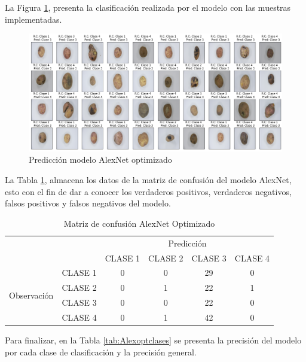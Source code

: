 \newpage
La Figura \ref{fig:pre_alex_opt}, presenta la clasificación realizada por el modelo con las muestras implementadas.
\begin{figure}[ht]
	\centering
	\includegraphics[scale=0.4]{Figs/502.png}
	\caption{Predicción modelo AlexNet optimizado}
	\label{fig:pre_alex_opt}
\end{figure}


La Tabla \ref{tab:MC_ALEX_OPT}, almacena los datos de la matriz de confusión del modelo AlexNet, esto con el fin de dar a conocer los verdaderos positivos, verdaderos negativos, falsos positivos y falsos negativos del modelo.


\begin{table}[htbp]
	\centering
	\begin{tabular}{|c|l|c|c|c|c|}
		\hline
		\multicolumn{2}{|c|}{\multirow{2}[4]{*}{}} & \multicolumn{4}{c|}{Predicción} \bigstrut\\
		\cline{3-6}    \multicolumn{2}{|c|}{} & CLASE 1 & CLASE 2 & CLASE 3 & CLASE 4 \bigstrut\\
		\hline
		\multirow{4}[8]{*}{\begin{sideways}Observación\end{sideways}} & CLASE 1 & 0     & 0     & 29    & 0 \bigstrut\\
		\cline{2-6}          & CLASE 2 & 0     & 1     & 22    & 1 \bigstrut\\
		\cline{2-6}          & CLASE 3 & 0     & 0     & 22    & 0 \bigstrut\\
		\cline{2-6}          & CLASE 4 & 0     & 1     & 42    & 0 \bigstrut\\
		\hline
	\end{tabular}%
	\caption{Matriz de confusión AlexNet Optimizado }
	\label{tab:MC_ALEX_OPT}%
\end{table}%

\newpage
Para finalizar, en la Tabla \ref{tab:Alexoptclases} se presenta la precisión del modelo por cada clase de clasificación y la precisión general.

